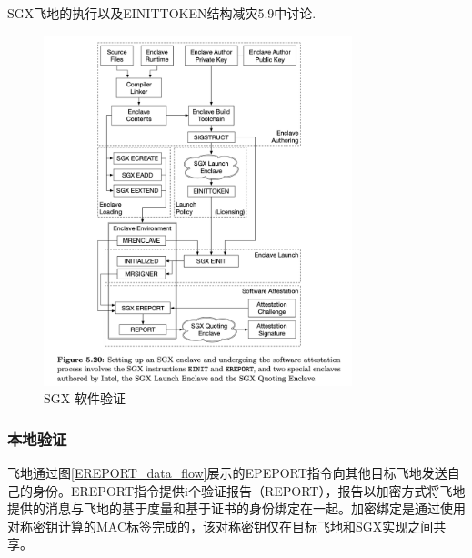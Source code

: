 SGX飞地的执行以及EINITTOKEN结构减灾5.9中讨论.

\begin{figure}
\centering
\includegraphics[width=0.8\textwidth]{images/SGX_software_attestation.png}
\caption{SGX 软件验证}
\label{SGXSoftwareAttestation}
\end{figure}

\subsubsection{本地验证}
飞地通过图\ref{EREPORT_data_flow}展示的EPEPORT指令向其他目标飞地发送自己的身份。EREPORT指令提供i个验证报告（REPORT），报告以加密方式将飞地提供的消息与飞地的基于度量和基于证书的身份绑定在一起。加密绑定是通过使用对称密钥计算的MAC标签完成的，该对称密钥仅在目标飞地和SGX实现之间共享。

